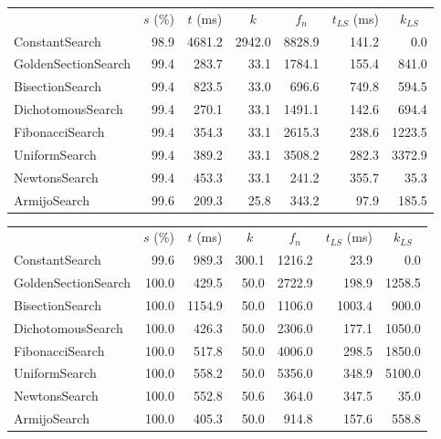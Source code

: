 \documentclass[a4paper,english,titlepage,12pt]{article}
\begin{document}
\begin{center}
\label{tab:performance_results_MSS_GDM}
\begin{tabular}{|l|r|r|r|r|r|r|}
\hline
\rowcolor{gray!25}
\multicolumn{1}{|c|}{Line Search Name} & \multicolumn{1}{c|}{$s$ (\%)} & \multicolumn{1}{c|}{$t$ (ms)} & \multicolumn{1}{c|}{$k$} & \multicolumn{1}{c|}{$f_n$} & \multicolumn{1}{c|}{$t_{LS}$ (ms)} & \multicolumn{1}{c|}{$k_{LS}$} \\
ConstantSearch & 98.9 & 4681.2 & 2942.0 & 8828.9 & 141.2 & 0.0 \\
GoldenSectionSearch & 99.4 & 283.7 & 33.1 & 1784.1 & 155.4 & 841.0 \\
BisectionSearch & 99.4 & 823.5 & 33.0 & 696.6 & 749.8 & 594.5 \\
DichotomousSearch & 99.4 & 270.1 & 33.1 & 1491.1 & 142.6 & 694.4 \\
FibonacciSearch & 99.4 & 354.3 & 33.1 & 2615.3 & 238.6 & 1223.5 \\
UniformSearch & 99.4 & 389.2 & 33.1 & 3508.2 & 282.3 & 3372.9 \\
NewtonsSearch & 99.4 & 453.3 & 33.1 & 241.2 & 355.7 & 35.3 \\
ArmijoSearch & 99.6 & 209.3 & 25.8 & 343.2 & 97.9 & 185.5 \\
\hline
\end{tabular}
\end{center}

\begin{center}
\label{tab:performance_results_MSS_CGM}
\begin{tabular}{|l|r|r|r|r|r|r|}
\hline
\rowcolor{gray!25}
\multicolumn{1}{|c|}{Line Search Name} & \multicolumn{1}{c|}{$s$ (\%)} & \multicolumn{1}{c|}{$t$ (ms)} & \multicolumn{1}{c|}{$k$} & \multicolumn{1}{c|}{$f_n$} & \multicolumn{1}{c|}{$t_{LS}$ (ms)} & \multicolumn{1}{c|}{$k_{LS}$} \\
ConstantSearch & 99.6 & 989.3 & 300.1 & 1216.2 & 23.9 & 0.0 \\
GoldenSectionSearch & 100.0 & 429.5 & 50.0 & 2722.9 & 198.9 & 1258.5 \\
BisectionSearch & 100.0 & 1154.9 & 50.0 & 1106.0 & 1003.4 & 900.0 \\
DichotomousSearch & 100.0 & 426.3 & 50.0 & 2306.0 & 177.1 & 1050.0 \\
FibonacciSearch & 100.0 & 517.8 & 50.0 & 4006.0 & 298.5 & 1850.0 \\
UniformSearch & 100.0 & 558.2 & 50.0 & 5356.0 & 348.9 & 5100.0 \\
NewtonsSearch & 100.0 & 552.8 & 50.6 & 364.0 & 347.5 & 35.0 \\
ArmijoSearch & 100.0 & 405.3 & 50.0 & 914.8 & 157.6 & 558.8 \\
\hline
\end{tabular}
\end{center}
\end{document}
